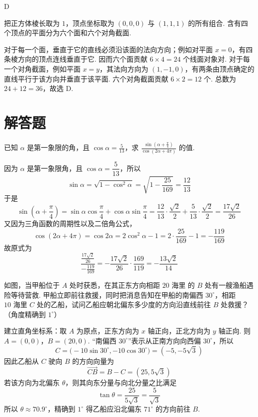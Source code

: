 \begin{answer}
D
\end{answer}

\begin{solution}
把正方体棱长取为 \(1\)，顶点坐标取为 \((0,0,0)\) 与 \((1,1,1)\) 的所有组合. 含有四个顶点的平面分为六个面和六个对角截面.

对于每一个面，垂直于它的直线必须沿该面的法向方向；例如对平面 \(x=0\)，有四条棱方向的顶点连线垂直于它. 因而六个面贡献 \(6\times4=24\) 个线面对象对. 对于每一个对角截面，例如平面 \(x=y\)，其法向方向为 \((1,-1,0)\)，有两条由顶点确定的直线平行于该方向并垂直于该平面. 六个对角截面贡献 \(6\times2=12\) 个. 总数为 \(24+12=36\)，故选 D.
\end{solution}

\section{解答题}
\begin{problem}
已知 \(\alpha\) 是第一象限的角，且 \(\cos \alpha = \frac{5}{13}\)，求 \(\frac{\sin\left(\alpha + \frac{\pi}{4}\right)}{\cos(2\alpha + 4\pi)}\) 的值.
\end{problem}

\begin{solution}
因为 \(\alpha\) 是第一象限角，且 \(\cos\alpha=\dfrac{5}{13}\)，所以
\[
\sin\alpha=\sqrt{1-\cos^2\alpha}
=\sqrt{1-\frac{25}{169}}
=\frac{12}{13}
\]
于是
\[
\sin\left(\alpha+\frac{\pi}{4}\right)
=\sin\alpha\cos\frac{\pi}{4}
+\cos\alpha\sin\frac{\pi}{4}
=\frac{12}{13}\cdot\frac{\sqrt2}{2}
+\frac{5}{13}\cdot\frac{\sqrt2}{2}
=\frac{17\sqrt2}{26}
\]
又因为三角函数的周期性以及二倍角公式，
\[
\cos(2\alpha+4\pi)=\cos2\alpha
=2\cos^2\alpha-1
=2\cdot\frac{25}{169}-1
=-\frac{119}{169}
\]
故原式为
\[
\frac{\frac{17\sqrt2}{26}}{-\frac{119}{169}}
=-\frac{17\sqrt2}{26}\cdot\frac{169}{119}
=-\frac{13\sqrt2}{14}
\]
\end{solution}

\begin{problem}
如图，当甲船位于 \(A\) 处时获悉，在其正东方向相距 \(20\text{ 海里}\) 的 \(B\) 处有一艘渔船遇险等待营救. 甲船立即前往救援，同时把消息告知在甲船的南偏西 \(30^{\circ}\)，相距 \(10\text{ 海里}\) \(C\) 处的乙船，试问乙船应朝北偏东多少度的方向沿直线前往 \(B\) 处救援？（角度精确到 \(1^{\circ}\)）

\end{problem}

\begin{solution}
建立直角坐标系：取 \(A\) 为原点，正东方向为 \(x\) 轴正向，正北方向为 \(y\) 轴正向. 则
\(A=(0,0)\)，\(B=(20,0)\).
“南偏西 \(30^\circ\)”表示从正南方向向西偏 \(30^\circ\)，所以
\[
C=\bigl(-10\sin30^\circ,-10\cos30^\circ\bigr)
=\left(-5,-5\sqrt3\right)
\]
因此乙船从 \(C\) 驶向 \(B\) 的方向向量为
\[
\overrightarrow{CB}=B-C=\left(25,5\sqrt3\right)
\]
若该方向为北偏东 \(\theta\)，则其向东分量与向北分量之比满足
\[
\tan\theta=\frac{25}{5\sqrt3}=\frac{5}{\sqrt3}
\]
所以 \(\theta\approx70.9^\circ\)，精确到 \(1^\circ\) 得乙船应沿北偏东 \(71^\circ\) 的方向前往 \(B\).
\end{solution}

